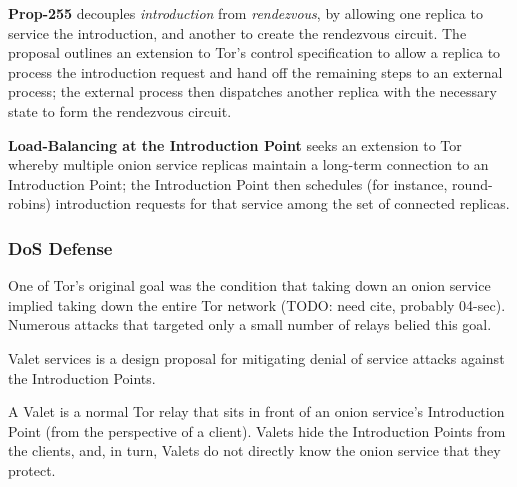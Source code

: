 \begin{widelist}

\item \textbf{Prop-255}
decouples \emph{introduction} from \emph{rendezvous},
by allowing one replica to service the introduction, and another to create the
rendezvous circuit.
%
The proposal outlines an extension to Tor's control specification to allow a
replica to process the introduction request and hand off the remaining steps
to an external process; the external process then dispatches another
replica with the necessary state to form the rendezvous circuit.


\item \textbf{Load-Balancing at the Introduction Point}
seeks an extension to Tor whereby multiple onion service replicas maintain a
long-term connection to an Introduction Point; the Introduction Point then
schedules (for instance, round-robins) introduction requests for that service
among the set of connected replicas.


\end{widelist}

\subsubsection{DoS Defense}

One of Tor's original goal was the condition that taking down an onion service
implied taking down the entire Tor network (TODO: need cite, probably 04-sec).
%
Numerous attacks that targeted only a small number of relays belied this goal.


Valet services is a design proposal for mitigating denial of service attacks
against the Introduction Points.


A Valet is a normal Tor relay that sits in front of an onion service's
Introduction Point (from the perspective of a client).
%
Valets hide the Introduction Points from the clients, and, in turn, Valets do
not directly know the onion service that they protect.


